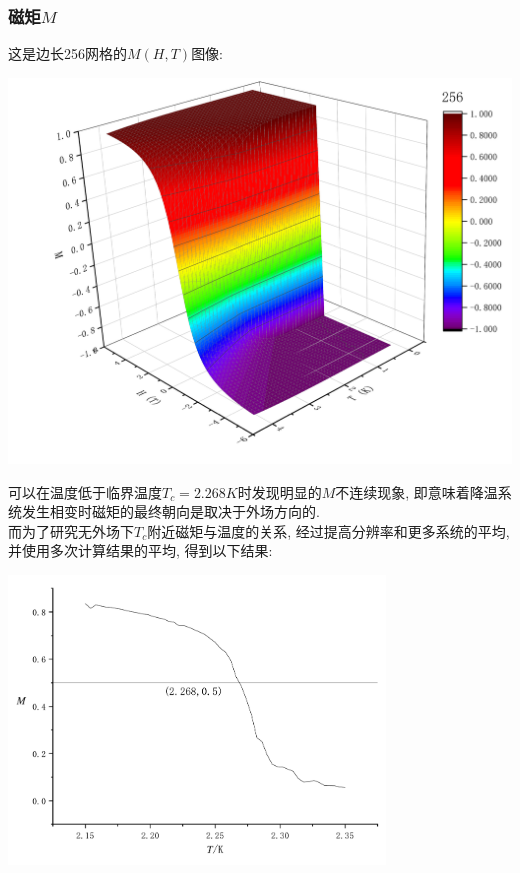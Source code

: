 \documentclass[UTF8]{ctexart}
\begin{document}
            \subsubsection{磁矩$M$}
                \indent 这是边长256网格的$M(H,T)$图像:
                \begin{center}
                    \includegraphics[width=17cm]{M-HT256.pdf}
                \end{center}
                可以在温度低于临界温度$T_c=2.268K$时发现明显的$M$不连续现象, 即意味着降温系统发生相变时磁矩的最终朝向是取决于外场方向的.\\
                \indent 而为了研究无外场下$T_c$附近磁矩与温度的关系, 经过提高分辨率和更多系统的平均, 并使用多次计算结果的平均, 得到以下结果:
                \begin{center}
                    \includegraphics[width=10cm]{PhaseTransition.pdf}
                \end{center}
                \newpage
\end{document}

